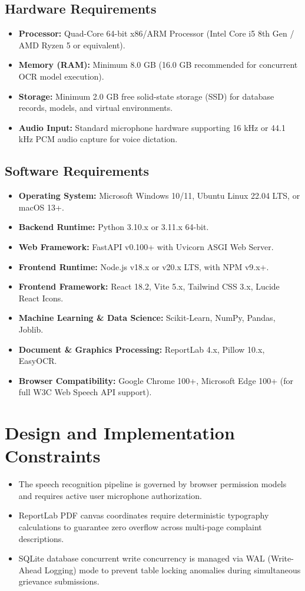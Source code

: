\subsection{Hardware Requirements}
\begin{itemize}
    \item \textbf{Processor:} Quad-Core 64-bit x86/ARM Processor (Intel Core i5 8th Gen / AMD Ryzen 5 or equivalent).
    \item \textbf{Memory (RAM):} Minimum 8.0 GB (16.0 GB recommended for concurrent OCR model execution).
    \item \textbf{Storage:} Minimum 2.0 GB free solid-state storage (SSD) for database records, models, and virtual environments.
    \item \textbf{Audio Input:} Standard microphone hardware supporting 16 kHz or 44.1 kHz PCM audio capture for voice dictation.
\end{itemize}

\subsection{Software Requirements}
\begin{itemize}
    \item \textbf{Operating System:} Microsoft Windows 10/11, Ubuntu Linux 22.04 LTS, or macOS 13+.
    \item \textbf{Backend Runtime:} Python 3.10.x or 3.11.x 64-bit.
    \item \textbf{Web Framework:} FastAPI v0.100+ with Uvicorn ASGI Web Server.
    \item \textbf{Frontend Runtime:} Node.js v18.x or v20.x LTS, with NPM v9.x+.
    \item \textbf{Frontend Framework:} React 18.2, Vite 5.x, Tailwind CSS 3.x, Lucide React Icons.
    \item \textbf{Machine Learning \& Data Science:} Scikit-Learn, NumPy, Pandas, Joblib.
    \item \textbf{Document \& Graphics Processing:} ReportLab 4.x, Pillow 10.x, EasyOCR.
    \item \textbf{Browser Compatibility:} Google Chrome 100+, Microsoft Edge 100+ (for full W3C Web Speech API support).
\end{itemize}

\section{Design and Implementation Constraints}
\begin{itemize}
    \item The speech recognition pipeline is governed by browser permission models and requires active user microphone authorization.
    \item ReportLab PDF canvas coordinates require deterministic typography calculations to guarantee zero overflow across multi-page complaint descriptions.
    \item SQLite database concurrent write concurrency is managed via WAL (Write-Ahead Logging) mode to prevent table locking anomalies during simultaneous grievance submissions.
\end{itemize}
